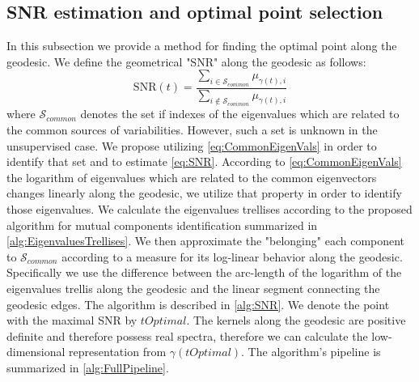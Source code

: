 \documentclass[]{article}
\theoremstyle{definition}
\begin{document}
	\subsection{SNR estimation and optimal point selection}
	In this subsection we provide a method for finding the optimal point along the geodesic. We define the geometrical "SNR" along the geodesic as follows:
	\begin{equation}
	\label{eq:SNR}
	\text{SNR}(t)=\frac{ \sum\limits_{i \in \mathcal{S}_{common}}{\mu_{\gamma(t),i}} }{\sum\limits_{i \notin \mathcal{S}_{common}}{\mu_{\gamma(t),i}}}
	\end{equation}
	where $\mathcal{S}_{common}$ denotes the set if indexes of the eigenvalues which are related to the common sources of variabilities.  
	However, such a set is unknown in the unsupervised case. We propose utilizing \ref{eq:CommonEigenVals} in order to identify that set and to estimate \ref{eq:SNR}.	According to \ref{eq:CommonEigenVals} the logarithm of eigenvalues which are related to the common eigenvectors changes linearly along the geodesic, we utilize that property in order to identify those eigenvalues. We calculate the eigenvalues trellises according to the proposed algorithm for mutual components identification summarized in \ref{alg:EigenvaluesTrellises}. We then approximate the "belonging" each component to $\mathcal{S}_{common}$ according to a measure for its log-linear behavior along the geodesic. Specifically we use the difference between the arc-length of the logarithm of the eigenvalues trellis along the geodesic and the linear segment connecting the geodesic edges. The algorithm is described in \ref{alg:SNR}.
	We denote the point with the maximal SNR by $tOptimal$. The kernels along the geodesic are positive definite and therefore possess real spectra, therefore we can calculate the low-dimensional representation from $\gamma(tOptimal)$. The algorithm's pipeline is summarized in \ref{alg:FullPipeline}.
		
		
	
\end{document}
